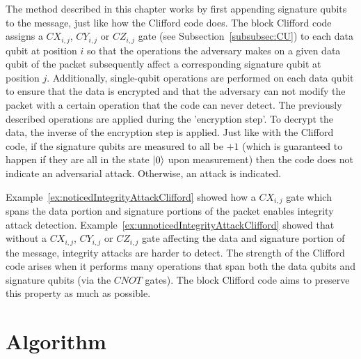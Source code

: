 The method described in this chapter works by first appending signature qubits to the message, just like how the Clifford code does. The block Clifford code assigns a $\mathit{CX}_{i,j}$, $\mathit{CY}_{i,j}$ or $\mathit{CZ}_{i,j}$ gate (see Subsection~\ref{subsubsec:CU}) to each data qubit at position $i$ so that the operations the adversary makes on a given data qubit of the packet subsequently affect a corresponding signature qubit at position $j$. Additionally, single-qubit operations are performed on each data qubit to ensure that the data is encrypted and that the adversary can not modify the packet with a certain operation that the code can never detect. The previously described operations are applied during the 'encryption step'. To decrypt the data, the inverse of the encryption step is applied. Just like with the Clifford code, if the signature qubits are measured to all be $+1$ (which is guaranteed to happen if they are all in the state $\Ket{0}$ upon measurement) then the code does not indicate an adversarial attack. Otherwise, an attack is indicated.

Example~\ref{ex:noticedIntegrityAttackClifford} showed how a $\mathit{CX}_{i,j}$ gate which spans the data portion and signature portions of the packet enables integrity attack detection. Example~\ref{ex:unnoticedIntegrityAttackClifford} showed that without a $\mathit{CX}_{i,j}$, $\mathit{CY}_{i,j}$ or $\mathit{CZ}_{i,j}$ gate affecting the data and signature portion of the message, integrity attacks are harder to detect. The strength of the Clifford code arises when it performs many operations that span both the data qubits and signature qubits (via the $\mathit{CNOT}$ gates). The block Clifford code aims to preserve this property as much as possible.
\section{Algorithm}
